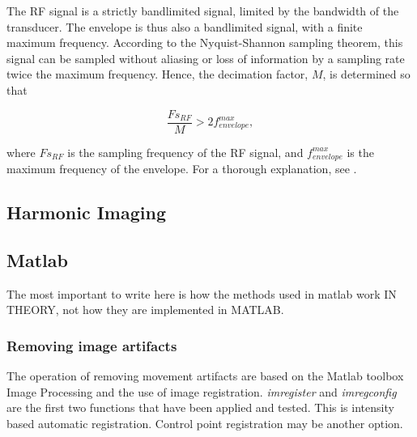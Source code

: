 The RF signal is a strictly bandlimited signal, limited by the bandwidth of the transducer. The envelope is thus also a bandlimited signal, with a finite maximum frequency. According to the Nyquist-Shannon sampling theorem, this signal can be sampled without aliasing or loss of information by a sampling rate twice the maximum frequency. Hence, the decimation factor, $M$, is determined so that

\begin{equation}
\label{deciamtion}
\frac{Fs_{RF}}{M} > 2f^{max}_{envelope},
\end{equation}

where $Fs_{RF}$ is the sampling frequency of the RF signal, and $f^{max}_{envelope}$ is the maximum frequency of the envelope. For a thorough explanation, see \cite{Crochiere1981}.



\subsection{Harmonic Imaging}

\subsection{Matlab}
The most important to write here is how the methods used in matlab work IN THEORY, not how they are implemented in MATLAB.


\subsubsection{Removing image artifacts}
The operation of removing movement artifacts are based on the Matlab toolbox Image Processing and the use of image registration. \textit{imregister} and \textit{imregconfig} are the first two functions that have been applied and tested. This is intensity based automatic registration. Control point registration may be another option.


